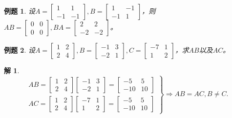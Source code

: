 \documentclass[a4paper]{book}
\newtheorem{eg}{例题}[chapter]
\newtheorem*{solution}{解}
\begin{document}
\begin{eg}
设$A = \begin{bmatrix} 1 & 1 \\ -1 & -1 \end{bmatrix}, B = \begin{bmatrix} 1 & -1 \\ -1 & 1 \end{bmatrix}$，则$AB = \begin{bmatrix} 0 & 0 \\0 & 0 \end{bmatrix}, BA = \begin{bmatrix} 2 & 2 \\ -2 & -2 \end{bmatrix}$。
\end{eg}

\begin{eg}
  设$A = \begin{bmatrix} 1 & 2 \\ 2 & 4 \end{bmatrix}, B = \begin{bmatrix} -1 & 3 \\ -2 & 1 \end{bmatrix}, C = \begin{bmatrix} -7 & 1 \\ 1 & 2 \end{bmatrix}$，求$AB$以及$AC$。
\end{eg}

\begin{solution}
$$\left. \begin{array}{c}
AB = \begin{bmatrix} 1 & 2 \\ 2 & 4 \end{bmatrix} \begin{bmatrix} -1 & 3 \\ -2 & 1 \end{bmatrix} = \begin{bmatrix} -5 & 5 \\ -10 & 10 \end{bmatrix} \\
AC = \begin{bmatrix} 1 & 2 \\ 2 & 4 \end{bmatrix} \begin{bmatrix} -7 & 1 \\ 1 & 2 \end{bmatrix} = \begin{bmatrix} -5 & 5 \\ -10 & 10 \end{bmatrix}
\end{array} \right\} \Rightarrow AB = AC, B \neq C.$$
\end{solution}
\end{document}
